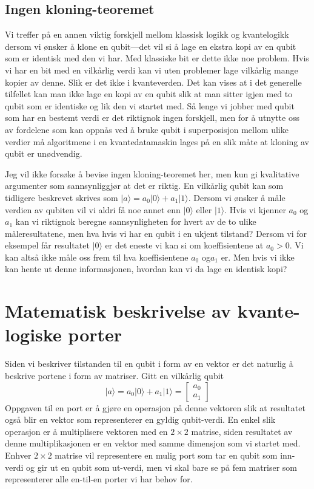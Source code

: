 \subsection{Ingen kloning-teoremet}
Vi treffer på en annen viktig forskjell mellom klassisk logikk og kvantelogikk dersom vi ønsker å klone en qubit---det vil si å lage en ekstra kopi av en qubit som er identisk med den vi har. Med klassiske bit er dette ikke noe problem. Hvis vi har en bit med en vilkårlig verdi kan vi uten problemer lage vilkårlig mange kopier av denne. Slik er det ikke i kvanteverden. Det kan vises at i det generelle tilfellet kan man ikke lage en kopi av en qubit slik at man sitter igjen med to qubit som er identiske og lik den vi startet med. Så lenge vi jobber med qubit som har en bestemt verdi er det riktignok ingen forskjell, men for å utnytte oss av fordelene som kan oppnås ved å bruke qubit i superposisjon mellom ulike verdier må algoritmene i en kvantedatamaskin lages på en slik måte at kloning av qubit er unødvendig.

Jeg vil ikke forsøke å bevise ingen kloning-teoremet her, men kun gi kvalitative argumenter som sannsynliggjør at det er riktig. En vilkårlig qubit kan som tidligere beskrevet skrives som $|a\rangle = a_0|0\rangle + a_1|1\rangle$. Dersom vi ønsker å måle verdien av qubiten vil vi aldri få noe annet enn $|0\rangle$ eller $|1\rangle$. Hvis vi kjenner $a_0$ og $a_1$ kan vi riktignok beregne sannsynligheten for hvert av de to ulike måleresultatene, men hva hvis vi har en qubit i en ukjent tilstand? Dersom vi for eksempel får resultatet $|0\rangle$ er det eneste vi kan si om koeffisientene at $a_0>0$. Vi kan altså ikke måle oss frem til hva koeffisientene $a_0$ og$a_1$ er. Men hvis vi ikke kan hente ut denne informasjonen, hvordan kan vi da lage en identisk kopi? 

\section{Matematisk beskrivelse av kvante-logiske porter}
Siden vi beskriver tilstanden til en qubit i form av en vektor er det naturlig å beskrive portene i form av matriser. Gitt en vilkårlig qubit 
\begin{displaymath}
	|a\rangle = a_0 |0\rangle + a_1|1\rangle = \left[\begin{array}{r} a_0 \\ a_1 \end{array}\right]
\end{displaymath}
Oppgaven til en port er å gjøre en operasjon på denne vektoren slik at resultatet også blir en vektor som representerer en gyldig qubit-verdi. En enkel slik operasjon er å multiplisere vektoren med en $2\times 2$ matrise, siden resultatet av denne multiplikasjonen er en vektor med samme dimensjon som vi startet med. Enhver $2\times2$ matrise vil representere en mulig port som tar en qubit som inn-verdi og gir ut en qubit som ut-verdi, men vi skal bare se på fem matriser som representerer alle en-til-en porter vi har behov for. 

